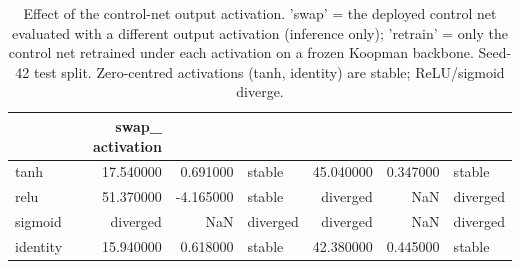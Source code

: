 \begin{table}
\caption{Effect of the control-net output activation. 'swap' = the deployed control net evaluated with a different output activation (inference only); 'retrain' = only the control net retrained under each activation on a frozen Koopman backbone. Seed-42 test split. Zero-centred activations (tanh, identity) are stable; ReLU/sigmoid diverge.}
\label{tab:control_activation}
\begin{tabular}{lrrlrrl}
\toprule
 & swap_%
activation &  &  &  &  &  &  \\
\midrule
tanh & 17.540000 & 0.691000 & stable & 45.040000 & 0.347000 & stable \\
relu & 51.370000 & -4.165000 & stable & diverged & NaN & diverged \\
sigmoid & diverged & NaN & diverged & diverged & NaN & diverged \\
identity & 15.940000 & 0.618000 & stable & 42.380000 & 0.445000 & stable \\
\bottomrule
\end{tabular}
\end{table}
